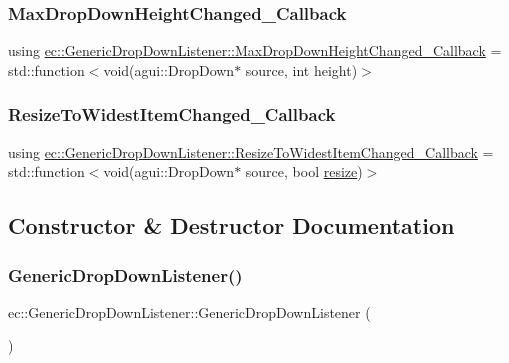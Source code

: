 \subsubsection{\texorpdfstring{Max\+Drop\+Down\+Height\+Changed\+\_\+\+Callback}{MaxDropDownHeightChanged\_Callback}}
{\footnotesize\ttfamily using \mbox{\hyperlink{classec_1_1_generic_drop_down_listener_a4acbadec20937340572893a989e248f1}{ec\+::\+Generic\+Drop\+Down\+Listener\+::\+Max\+Drop\+Down\+Height\+Changed\+\_\+\+Callback}} =  std\+::function$<$void(agui\+::\+Drop\+Down$\ast$ source, int height)$>$}

\mbox{\label{classec_1_1_generic_drop_down_listener_a3a4f9e1a8d9e016ea30e8cc781b8bcb9}} 
\subsubsection{\texorpdfstring{Resize\+To\+Widest\+Item\+Changed\+\_\+\+Callback}{ResizeToWidestItemChanged\_Callback}}
{\footnotesize\ttfamily using \mbox{\hyperlink{classec_1_1_generic_drop_down_listener_a3a4f9e1a8d9e016ea30e8cc781b8bcb9}{ec\+::\+Generic\+Drop\+Down\+Listener\+::\+Resize\+To\+Widest\+Item\+Changed\+\_\+\+Callback}} =  std\+::function$<$void(agui\+::\+Drop\+Down$\ast$ source, bool \mbox{\hyperlink{namespaceec_a84e452d7f020435b50e2c18e7cdca968}{resize}})$>$}



\subsection{Constructor \& Destructor Documentation}
\mbox{\label{classec_1_1_generic_drop_down_listener_ab0f41e6d3614c6c367de876820dbc14a}} 
\subsubsection{\texorpdfstring{Generic\+Drop\+Down\+Listener()}{GenericDropDownListener()}}
{\footnotesize\ttfamily ec\+::\+Generic\+Drop\+Down\+Listener\+::\+Generic\+Drop\+Down\+Listener (\begin{DoxyParamCaption}{ }\end{DoxyParamCaption})\hspace{0.3cm}{\ttfamily [explicit]}}

